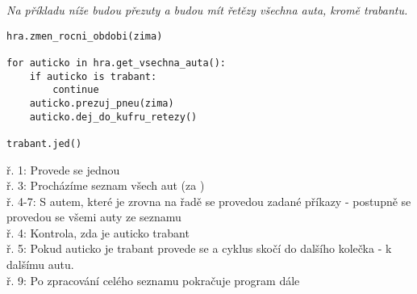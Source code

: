 \vspace{1cm}
\textit{Na příkladu níže budou přezuty a budou mít řetězy všechna auta, kromě trabantu.}\\
\begin{minipage}[t]{.45\textwidth}
\begin{code}
\begin{verbatim}
hra.zmen_rocni_obdobi(zima)

for auticko in hra.get_vsechna_auta():
	if auticko is trabant:
		continue
	auticko.prezuj_pneu(zima)
	auticko.dej_do_kufru_retezy()	

trabant.jed()
\end{verbatim}

\label{code:continue}
\end{code}
\end{minipage}
\begin{minipage}[t]{.45\textwidth}
\vspace{1.5cm}
ř. 1:	Provede se jednou\\
ř. 3:	Procházíme seznam všech aut (za )\\
ř. 4-7:	S autem, které je zrovna na řadě se provedou zadané příkazy - postupně se provedou se všemi auty ze seznamu\\
ř. 4:	Kontrola, zda je auticko trabant\\
ř. 5:	Pokud auticko je trabant provede se  a cyklus skočí do dalšího kolečka - k dalšímu autu.\\
ř. 9:	Po zpracování celého seznamu pokračuje program dále
\end{minipage}\\
 
 

